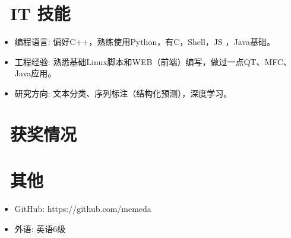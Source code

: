 \documentclass{resume}
\begin{document}
\section{\faCogs\ IT 技能}
\begin{itemize}[parsep=0.5ex]
  \item 编程语言: 偏好C++，熟练使用Python，有C，Shell，JS ，Java基础。
  \item 工程经验: 熟悉基础Linux脚本和WEB（前端）编写，做过一点QT、MFC、Java应用。
  \item 研究方向: 文本分类、序列标注（结构化预测），深度学习。
\end{itemize}

\section{\faHeartO\ 获奖情况}

\section{\faInfo\ 其他}
\begin{itemize}[parsep=0.5ex]
  \item GitHub: https://github.com/memeda
  \item 外语: 英语6级
\end{itemize}


%
%
\end{document}
